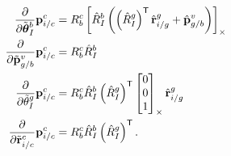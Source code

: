 \begin{align*}
  \frac{\partial}{\partial \tilde{\boldsymbol{\mathrm{\theta}}}_I^b } \boldsymbol{\mathrm{p}}_{i/c}^c
  &=
  R_b^c \left[  \hat{R}_I^b \left( \left( \hat{R}_I^g \right)^{\mathsf{T}}
  \hat{\boldsymbol{\mathrm{r}}}_{i/g}^g + \hat{\boldsymbol{\mathrm{p}}}_{g/b}^v \right)  \right]_{\times} \\
  \frac{\partial}{\partial \tilde{\boldsymbol{\mathrm{p}}}_{g/b}^v} \boldsymbol{\mathrm{p}}_{i/c}^c
  &=
  R_b^c \hat{R}_I^b \\
  \frac{\partial}{\partial \tilde{\theta}_I^g} \boldsymbol{\mathrm{p}}_{i/c}^c
  &=
  R_b^c \hat{R}_I^b \left( \hat{R}_I^g \right)^{\mathsf{T}}
  \left[ \begin{matrix} 0 \\ 0 \\ 1 \end{matrix} \right]_{\times} \hat{\boldsymbol{\mathrm{r}}}_{i/g}^g \\
  \frac{\partial}{\partial \tilde{\boldsymbol{\mathrm{r}}}_{i/c}^c} \boldsymbol{\mathrm{p}}_{i/c}^c
  &=
  R_b^c \hat{R}_I^b \left( \hat{R}_I^g \right)^{\mathsf{T}} .
\end{align*}




